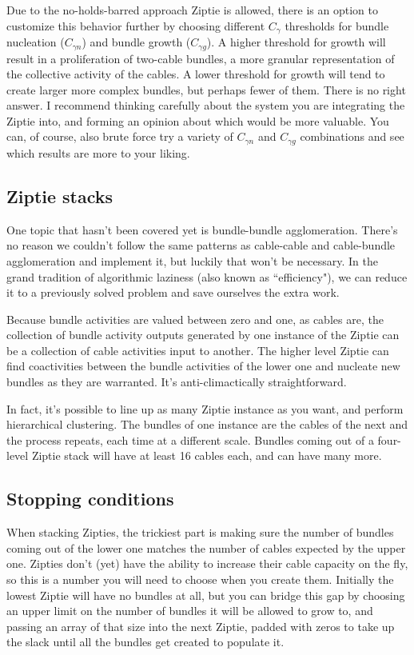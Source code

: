 Due to the no-holds-barred approach Ziptie is allowed, there is an
option to customize this behavior further by choosing different
$C_\gamma$ thresholds for bundle nucleation ($C_{\gamma n}$) and
bundle growth ($C_{\gamma g}$). A higher threshold for growth
will result in a proliferation of two-cable bundles, a more granular
representation of the collective activity of the cables.
A lower threshold for growth will tend to create larger more complex
bundles, but perhaps fewer of them. There is no right answer.
I recommend thinking carefully about the system you are integrating the
Ziptie into, and forming an opinion about which would be more valuable.
You can, of course, also brute force try
a variety of $C_{\gamma n}$ and $C_{\gamma g}$
combinations and see which results are more to your liking.

\subsection{Ziptie stacks}
\label{subsec:algolayers}

One topic that hasn't been covered yet is bundle-bundle agglomeration.
There's no reason we couldn't follow the same patterns
as cable-cable and cable-bundle agglomeration and implement it,
but luckily that won't be necessary. In the grand tradition of algorithmic
laziness (also known as ``efficiency"),
we can reduce it to a previously solved problem
and save ourselves the extra work.

Because bundle activities are valued between zero and one,
as cables are,
the collection of bundle activity outputs generated by one instance
of the Ziptie can be a collection of cable activities
input to another. The higher level Ziptie can find coactivities
between the bundle activities of the lower one and nucleate new bundles
as they are warranted. It's anti-climactically straightforward. 

In fact, it's possible to line up as many Ziptie instance as you want,
and perform hierarchical clustering. The bundles of one instance are
the cables of the next and the process repeats, each time at a different
scale. Bundles coming out of a four-level Ziptie stack will have at least
16 cables each, and can have many more.

\subsection{Stopping conditions}
\label{subsec:algostopping}

When stacking Zipties, the trickiest part is making sure the number of bundles
coming out of the lower one matches the number of cables expected by
the upper one. Zipties don't (yet) have the ability to increase their
cable capacity on the fly, so this is a number you will need to choose
when you create them. Initially the lowest Ziptie will have no bundles
at all, but you can bridge this gap by choosing an upper limit on
the number of bundles it will be allowed to grow to, and passing an array
of that size into the next Ziptie, padded with zeros to take up the slack
until all the bundles get created to populate it.

